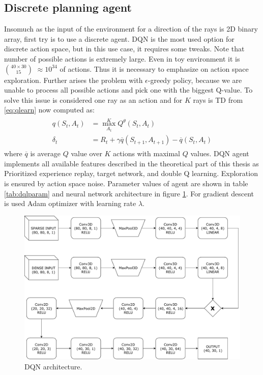 \subsection{Discrete planning agent}
Insomuch as the input of the environment for a direction of the rays is 2D binary array, first try is to use a discrete agent. DQN is the most used option for discrete action space, but in this use case, it requires some tweaks. Note that number of possible actions is extremely large. Even in toy environment it is $40\times30 \choose 15$ $\approx 10^{34}$ of actions. Thus it is necessary to emphasize on action space exploration. Further arises the problem with $\epsilon$-greedy policy, because we are unable to process all possible actions and pick one with the biggest Q-value. To solve this issue is considered one ray as an action and for $K$ rays is TD from \eqref{eq:qlearn} now computed as:
\begin{align} \label{eq:dql}
\begin{split}
q(S_t, A_t) &= \max\limits_{A_t}^K Q^\theta(S_t, A_t)\\
\delta_t &= R_t + \gamma \overline{q}(S_{t+1}, A_{t+1}) - \overline{q}(S_t, A_t)
\end{split}
\end{align}
where $\overline{q}$ is average $Q$ value over $K$ actions with maximal $Q$ values. DQN agent implements all available features described in the theoretical part of this thesis as Prioritized experience replay, target network, and double Q learning. Exploration is ensured by action space noise. Parameter values of agent are shown in table \ref{tab:dqlparam} and neural network architecture in figure \ref{fig:dqn}. For gradient descent is used Adam optimizer with learning rate $\lambda$.

\clearpage
\begin{figure}[!h]
\centering
\includegraphics[scale=0.6]{fig/dql.pdf}
\caption{DQN architecture.}
\label{fig:dqn}
\end{figure}

